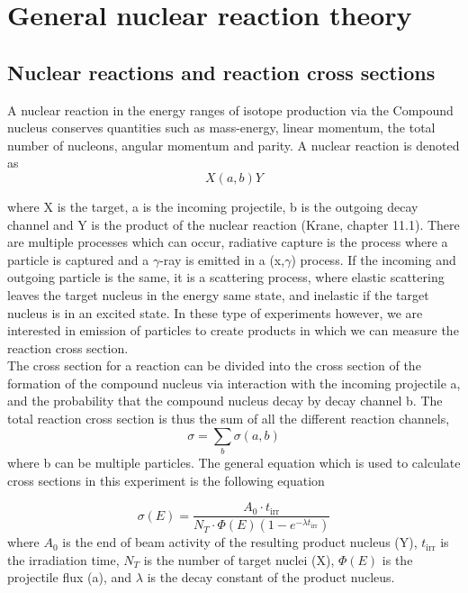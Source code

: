 \documentclass[a4paper,11pt,twoside]{book}
\begin{document}
\section{General nuclear reaction theory}

\subsection{Nuclear reactions and reaction cross sections}

A nuclear reaction in the energy ranges of isotope production via the Compound nucleus conserves quantities such as mass-energy, linear momentum, the total number of nucleons, angular momentum and parity. A nuclear reaction is denoted as
\begin{equation}
    X(a,b)Y
\end{equation}


\noindent where X is the target, a is the incoming projectile, b is the outgoing decay channel and Y is the product of the nuclear reaction (Krane, chapter 11.1). There are multiple processes which can occur, radiative capture is the process where a particle is captured and a $\gamma$-ray is emitted in a (x,$\gamma$) process. If the incoming and outgoing particle is the same, it is a scattering process, where elastic scattering leaves the target nucleus in the energy same state, and inelastic if the target nucleus is in an excited state. In these type of experiments however, we are interested in emission of particles to create products in which we can measure the reaction cross section. \\

\noindent 
The cross section for a reaction can be divided into the cross section of the formation of the compound nucleus via interaction with the incoming projectile a, and the probability that the compound nucleus decay by decay channel b. The total reaction cross section is thus the sum of all the different reaction channels, 
\begin{equation}
    \sigma = \sum_b \sigma(a,b)
\end{equation}
where b can be multiple particles. The general equation which is used to calculate cross sections in this experiment is the following equation

\begin{equation}
    \sigma(E) = \frac{A_0 \cdot t_\text{irr}}{N_T \cdot \Phi(E)(1-e^{-\lambda t_\text{irr}})}
\end{equation}
\noindent where $A_0$ is the end of beam activity of the resulting product nucleus (Y), $t_\text{irr}$ is the irradiation time, $N_T$ is the number of target nuclei (X), $\Phi(E)$ is the projectile flux (a), and $\lambda$ is the decay constant of the product nucleus. \\ 
\end{document}
